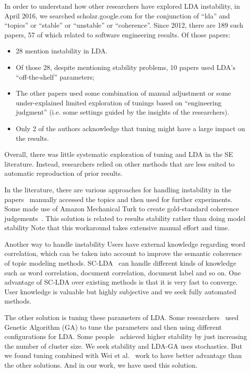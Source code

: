 \documentclass[10pt,conference]{IEEEtran}
\newcommand{\bi}{\begin{itemize}}
\newcommand{\ei}{\end{itemize}}
\theoremstyle{break}
\begin{document}
In order to understand how other researchers have explored LDA instability,
in April 2016, we searched
scholar.google.com for the conjunction of “lda” and “topics” or “stable” or
“unstable” or “coherence”. Since 2012, there are  189 such papers, 57
of which related to software engineering results. Of those papers:
\bi
\item 28
mention instability in LDA. %
\item Of those 28, despite mentioning stability problems,
  10 papers used LDA's ``off-the-shelf'' parameters;
  \item The  other papers used some combination of manual adjustment or some
under-explained limited exploration of tunings based on ``engineering judgment''
(i.e. some settings guided by the insights of the researchers).
\item
Only 2 of the authors acknowledge that tuning might have a large impact
on the results.
\ei
Overall, there was little systematic exploration of tuning and LDA in the SE literature.
Instead, researchers relied on other methods that are less suited to automatic reproduction
of prior results.

In the literature, there are various approaches for handling instability
in the papers~\cite{maskeri2008mining, martin2015app, guzman2014users}
    manually accessed the topics and then used for further experiments. Some
    made use of Amazon Mechanical Turk to create gold-standard coherence
    judgements~\cite{lau2014machine}. This solution is related to results
    stability rather than doing model stability
    Note that this workaround takes extensive manual effort and time.

Another way to handle instability
Users have external knowledge regarding word correlation, which can be taken into account to improve the semantic coherence of topic modeling methods. SC-LDA~\cite{yang2015improving} can handle different kinds of knowledge such as word correlation, document correlation, document label and so on. One advantage of SC-LDA over existing methods is that it is very fast to converge.
User knowledge is valuable but highly subjective and we seek fully automated methods.

 The other solution is tuning these parameters of LDA. Some
researchers~\cite{panichella2013effectively, lohar2013improving, sun2015msr4sm}
used Genetic Algorithm (GA) to tune the parameters and then using different
configurations for LDA. Some people~\cite{galvis2013analysis, tian2009using}
achieved higher stability by just increasing the number of cluster size.
We seek stability and LDA-GA uses stochastics. But we found tuning
  combined with Wei et al.~\cite{fu2016tuning} work to have better advantage
  than the other solutions. And in our work, we have used this solution.
 
\end{document}
